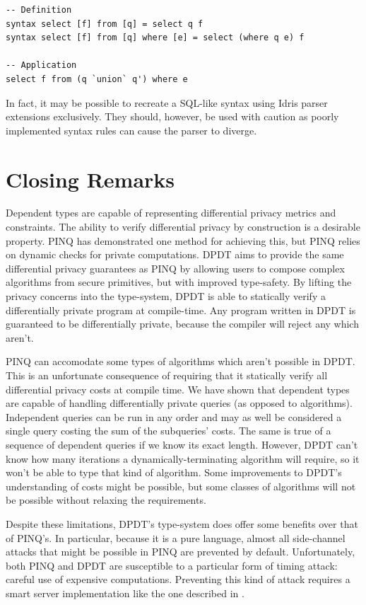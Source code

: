 \documentclass[12pt]{report}
\begin{document}
\begin{lstlisting}[caption={Extending Idris' syntax},label={lst:syntax_extensions}]
-- Definition
syntax select [f] from [q] = select q f
syntax select [f] from [q] where [e] = select (where q e) f

-- Application
select f from (q `union` q') where e
\end{lstlisting}

In fact, it may be possible to recreate a SQL-like syntax using Idris parser extensions exclusively.
They should, however, be used with caution as poorly implemented syntax rules can cause the parser to diverge.

\section{Closing Remarks}

Dependent types are capable of representing differential privacy metrics and constraints.
The ability to verify differential privacy by construction is a desirable property.
PINQ has demonstrated one method for achieving this, but PINQ relies on dynamic checks for private computations.
DPDT aims to provide the same differential privacy guarantees as PINQ by allowing users to compose complex algorithms from secure primitives, but with improved type-safety.
By lifting the privacy concerns into the type-system, DPDT is able to statically verify a differentially private program at compile-time.
Any program written in DPDT is guaranteed to be differentially private, because the compiler will reject any which aren't.

PINQ can accomodate some types of algorithms which aren't possible in DPDT.
This is an unfortunate consequence of requiring that it statically verify all differential privacy costs at compile time.
We have shown that dependent types are capable of handling differentially private queries (as opposed to algorithms).
Independent queries can be run in any order and may as well be considered a single query costing the sum of the subqueries' costs.
The same is true of a sequence of dependent queries if we know its exact length.
However, DPDT can't know how many iterations a dynamically-terminating algorithm will require, so it won't be able to type that kind of algorithm.
Some improvements to DPDT's understanding of costs might be possible, but some classes of algorithms will not be possible without relaxing the requirements.

Despite these limitations, DPDT's type-system does offer some benefits over that of PINQ's.
In particular, because it is a pure language, almost all side-channel attacks that might be possible in PINQ are prevented by default.
Unfortunately, both PINQ and DPDT are susceptible to a particular form of timing attack: careful use of expensive computations.
Preventing this kind of attack requires a smart server implementation like the one described in \cite{conf/uss/HaeberlenPN11}.
\end{document}
